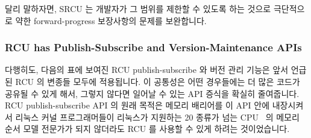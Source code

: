달리 말하자면, SRCU 는 개발자가 그 범위를 제한할 수 있도록 하는 것으로
극단적으로 약한 forward-progress 보장사항의 문제를 보완합니다.
\iffalse

In other words, SRCU compensate for their extremely weak
forward-progress guarantees by permitting the developer to restrict
their scope.
\fi

\subsubsection{RCU has Publish-Subscribe and Version-Maintenance APIs}
\label{sec:defer:RCU has Publish-Subscribe and Version-Maintenance APIs}

다행히도, 다음의 표에 보여진 RCU publish-subscribe 와 버전 관리 기능은 앞서
언급된 RCU 의 변종들 모두에 적용됩니다.
이 공통성은 어떤 경우들에는 더 많은 코드가 공유될 수 있게 해서, 그렇지 않다면
일어날 수 있는 API 증식을 확실히 줄여줍니다.
RCU publish-subscribe API 의 원래 목적은 메모리 배리어를 이 API 안에 내장시켜서
리눅스 커널 프로그래머들이 리눅스가 지원하는 20 종류가 넘는 CPU~\cite{Spraul01}
의 메모리 순서 모델 전문가가 되지 않더라도 RCU 를 사용할 수 있게 하려는
것이었습니다.
\iffalse

Fortunately, the RCU publish-subscribe and version-maintenance
primitives shown in the following
table apply to all of the variants of RCU discussed above.
This commonality can in some cases allow more code to be shared,
which certainly reduces the API proliferation that would otherwise
occur.
The original purpose of the RCU publish-subscribe APIs was to
bury memory barriers into these APIs, so that Linux kernel
programmers could use RCU without needing to become expert on
the memory-ordering models of each of the 20+ CPU families
that Linux supports~\cite{Spraul01}.
\fi

